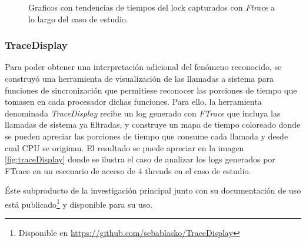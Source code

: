 \begin{figure}[h!]
	\centering
	\hspace*{\fill}
	\hfill
	\caption{Graficos con tendencias de tiempos del lock capturados con \emph{Ftrace} a lo largo del caso de estudio.}
	\label{fig:Ftracebloquealibera}
	\hspace*{\fill}
\end{figure}

\subsubsection{TraceDisplay}
Para poder obtener una interpretación adicional del fenómeno reconocido, se construyó una herramienta de visualización de las llamadas a sistema para funciones de sincronización que permitiese reconocer las porciones de tiempo que tomasen en cada procesador dichas funciones. Para ello, la herramienta denominada \emph{TraceDisplay} recibe un log generado con \emph{FTrace} que incluya las llamadas de sistema ya filtradas, y construye un mapa de tiempo coloreado donde se pueden apreciar las porciones de tiempo que consume cada llamada y desde cual CPU se originan. El resultado se puede apreciar en la imagen \ref{fig:traceDisplay} donde se ilustra el caso de analizar los logs generados por FTrace en un escenario de acceso de 4 threads en el caso de estudio.

Éste subproducto de la investigación principal junto con su documentación de uso está publicado\footnote{Disponible en \url{https://github.com/sebablasko/TraceDisplay}} y disponible para su uso.

